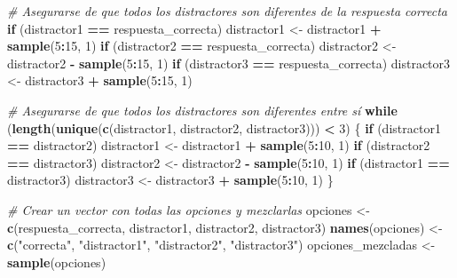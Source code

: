 \documentclass[
]{article}
\newenvironment{Shaded}{\begin{snugshade}}{\end{snugshade}}
\newcommand{\CommentTok}[1]{\textcolor[rgb]{0.56,0.35,0.01}{\textit{#1}}}
\newcommand{\ControlFlowTok}[1]{\textcolor[rgb]{0.13,0.29,0.53}{\textbf{#1}}}
\newcommand{\DecValTok}[1]{\textcolor[rgb]{0.00,0.00,0.81}{#1}}
\newcommand{\FunctionTok}[1]{\textcolor[rgb]{0.13,0.29,0.53}{\textbf{#1}}}
\newcommand{\NormalTok}[1]{#1}
\newcommand{\OtherTok}[1]{\textcolor[rgb]{0.56,0.35,0.01}{#1}}
\newcommand{\SpecialCharTok}[1]{\textcolor[rgb]{0.81,0.36,0.00}{\textbf{#1}}}
\newcommand{\StringTok}[1]{\textcolor[rgb]{0.31,0.60,0.02}{#1}}
\begin{document}
\begin{Shaded}
\begin{Highlighting}[]
\CommentTok{\# Asegurarse de que todos los distractores son diferentes de la respuesta correcta}
\ControlFlowTok{if}\NormalTok{ (distractor1 }\SpecialCharTok{==}\NormalTok{ respuesta\_correcta) distractor1 }\OtherTok{\textless{}{-}}\NormalTok{ distractor1 }\SpecialCharTok{+} \FunctionTok{sample}\NormalTok{(}\DecValTok{5}\SpecialCharTok{:}\DecValTok{15}\NormalTok{, }\DecValTok{1}\NormalTok{)}
\ControlFlowTok{if}\NormalTok{ (distractor2 }\SpecialCharTok{==}\NormalTok{ respuesta\_correcta) distractor2 }\OtherTok{\textless{}{-}}\NormalTok{ distractor2 }\SpecialCharTok{{-}} \FunctionTok{sample}\NormalTok{(}\DecValTok{5}\SpecialCharTok{:}\DecValTok{15}\NormalTok{, }\DecValTok{1}\NormalTok{)}
\ControlFlowTok{if}\NormalTok{ (distractor3 }\SpecialCharTok{==}\NormalTok{ respuesta\_correcta) distractor3 }\OtherTok{\textless{}{-}}\NormalTok{ distractor3 }\SpecialCharTok{+} \FunctionTok{sample}\NormalTok{(}\DecValTok{5}\SpecialCharTok{:}\DecValTok{15}\NormalTok{, }\DecValTok{1}\NormalTok{)}

\CommentTok{\# Asegurarse de que todos los distractores son diferentes entre sí}
\ControlFlowTok{while}\NormalTok{ (}\FunctionTok{length}\NormalTok{(}\FunctionTok{unique}\NormalTok{(}\FunctionTok{c}\NormalTok{(distractor1, distractor2, distractor3))) }\SpecialCharTok{\textless{}} \DecValTok{3}\NormalTok{) \{}
  \ControlFlowTok{if}\NormalTok{ (distractor1 }\SpecialCharTok{==}\NormalTok{ distractor2) distractor1 }\OtherTok{\textless{}{-}}\NormalTok{ distractor1 }\SpecialCharTok{+} \FunctionTok{sample}\NormalTok{(}\DecValTok{5}\SpecialCharTok{:}\DecValTok{10}\NormalTok{, }\DecValTok{1}\NormalTok{)}
  \ControlFlowTok{if}\NormalTok{ (distractor2 }\SpecialCharTok{==}\NormalTok{ distractor3) distractor2 }\OtherTok{\textless{}{-}}\NormalTok{ distractor2 }\SpecialCharTok{{-}} \FunctionTok{sample}\NormalTok{(}\DecValTok{5}\SpecialCharTok{:}\DecValTok{10}\NormalTok{, }\DecValTok{1}\NormalTok{)}
  \ControlFlowTok{if}\NormalTok{ (distractor1 }\SpecialCharTok{==}\NormalTok{ distractor3) distractor3 }\OtherTok{\textless{}{-}}\NormalTok{ distractor3 }\SpecialCharTok{+} \FunctionTok{sample}\NormalTok{(}\DecValTok{5}\SpecialCharTok{:}\DecValTok{10}\NormalTok{, }\DecValTok{1}\NormalTok{)}
\NormalTok{\}}

\CommentTok{\# Crear un vector con todas las opciones y mezclarlas}
\NormalTok{opciones }\OtherTok{\textless{}{-}} \FunctionTok{c}\NormalTok{(respuesta\_correcta, distractor1, distractor2, distractor3)}
\FunctionTok{names}\NormalTok{(opciones) }\OtherTok{\textless{}{-}} \FunctionTok{c}\NormalTok{(}\StringTok{"correcta"}\NormalTok{, }\StringTok{"distractor1"}\NormalTok{, }\StringTok{"distractor2"}\NormalTok{, }\StringTok{"distractor3"}\NormalTok{)}
\NormalTok{opciones\_mezcladas }\OtherTok{\textless{}{-}} \FunctionTok{sample}\NormalTok{(opciones)}


\end{Highlighting}
\end{Shaded}
\end{document}
